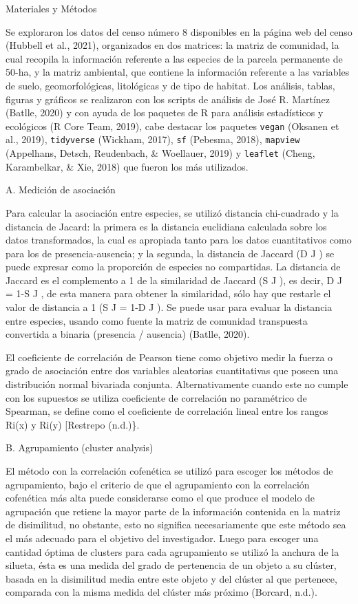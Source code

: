 \documentclass[11pt,]{article}
\begin{document}
Materiales y Métodos

Se exploraron los datos del censo número 8 disponibles en la página web
del censo (Hubbell et al., 2021), organizados en dos matrices: la matriz
de comunidad, la cual recopila la información referente a las especies
de la parcela permanente de 50-ha, y la matriz ambiental, que contiene
la información referente a las variables de suelo, geomorfológicas,
litológicas y de tipo de habitat. Los análisis, tablas, figuras y
gráficos se realizaron con los scripts de análisis de José R. Martínez
(Batlle, 2020) y con ayuda de los paquetes de R para análisis
estadísticos y ecológicos (R Core Team, 2019), cabe destacar los
paquetes \texttt{vegan} (Oksanen et al., 2019), \texttt{tidyverse}
(Wickham, 2017), \texttt{sf} (Pebesma, 2018), \texttt{mapview}
(Appelhans, Detsch, Reudenbach, \& Woellauer, 2019) y \texttt{leaflet}
(Cheng, Karambelkar, \& Xie, 2018) que fueron los más utilizados.

A. Medición de asociación

Para calcular la asociación entre especies, se utilizó distancia
chi-cuadrado y la distancia de Jacard: la primera es la distancia
euclidiana calculada sobre los datos transformados, la cual es apropiada
tanto para los datos cuantitativos como para los de presencia-ausencia;
y la segunda, la distancia de Jaccard (D J ) se puede expresar como la
proporción de especies no compartidas. La distancia de Jaccard es el
complemento a 1 de la similaridad de Jaccard (S J ), es decir, D J = 1-S
J , de esta manera para obtener la similaridad, sólo hay que restarle el
valor de distancia a 1 (S J = 1-D J ). Se puede usar para evaluar la
distancia entre especies, usando como fuente la matriz de comunidad
transpuesta convertida a binaria (presencia / ausencia) (Batlle, 2020).

El coeficiente de correlación de Pearson tiene como objetivo medir la
fuerza o grado de asociación entre dos variables aleatorias
cuantitativas que poseen una distribución normal bivariada conjunta.
Alternativamente cuando este no cumple con los supuestos se utiliza
coeficiente de correlación no paramétrico de Spearman, se define como el
coeficiente de correlación lineal entre los rangos Ri(x) y Ri(y)
{[}Restrepo (n.d.)\}.

B. Agrupamiento (cluster analysis)

El método con la correlación cofenética se utilizó para escoger los
métodos de agrupamiento, bajo el criterio de que el agrupamiento con la
correlación cofenética más alta puede considerarse como el que produce
el modelo de agrupación que retiene la mayor parte de la información
contenida en la matriz de disimilitud, no obstante, esto no significa
necesariamente que este método sea el más adecuado para el objetivo del
investigador. Luego para escoger una cantidad óptima de clusters para
cada agrupamiento se utilizó la anchura de la silueta, ésta es una
medida del grado de pertenencia de un objeto a su clúster, basada en la
disimilitud media entre este objeto y del clúster al que pertenece,
comparada con la misma medida del clúster más próximo (Borcard, n.d.).
\end{document}
